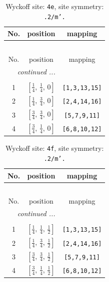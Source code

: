 \documentclass[fleqn,8pt]{jsarticle}
\begin{document}
\renewcommand{\arraystretch}{1.2}
\begin{longtable}{ccc}
\caption{Wyckoff site: {\tt 4e}, site symmetry: {\tt .2/m'.}}
 \\
 \hline \hline
No. & position & mapping \\ \hline \endfirsthead

\multicolumn{2}{l}{\tablename\ \thetable{}} \\
 \hline \hline
No. & position & mapping \\ \hline \endhead

 \hline \hline
\multicolumn{2}{r}{\footnotesize\it continued ...} \\ \endfoot

 \hline \hline
\multicolumn{2}{r}{} \\ \endlastfoot

1 & $\left[ \frac{1}{4},\, \frac{1}{4},\, 0 \right]$ & {\tt [1,3,13,15]} \\ \hline
2 & $\left[ \frac{1}{4},\, \frac{3}{4},\, 0 \right]$ & {\tt [2,4,14,16]} \\ \hline
3 & $\left[ \frac{3}{4},\, \frac{3}{4},\, 0 \right]$ & {\tt [5,7,9,11]} \\ \hline
4 & $\left[ \frac{3}{4},\, \frac{1}{4},\, 0 \right]$ & {\tt [6,8,10,12]} \\
\end{longtable}
\renewcommand{\arraystretch}{1.2}
\begin{longtable}{ccc}
\caption{Wyckoff site: {\tt 4f}, site symmetry: {\tt .2/m'.}}
 \\
 \hline \hline
No. & position & mapping \\ \hline \endfirsthead

\multicolumn{2}{l}{\tablename\ \thetable{}} \\
 \hline \hline
No. & position & mapping \\ \hline \endhead

 \hline \hline
\multicolumn{2}{r}{\footnotesize\it continued ...} \\ \endfoot

 \hline \hline
\multicolumn{2}{r}{} \\ \endlastfoot

1 & $\left[ \frac{1}{4},\, \frac{1}{4},\, \frac{1}{2} \right]$ & {\tt [1,3,13,15]} \\ \hline
2 & $\left[ \frac{1}{4},\, \frac{3}{4},\, \frac{1}{2} \right]$ & {\tt [2,4,14,16]} \\ \hline
3 & $\left[ \frac{3}{4},\, \frac{3}{4},\, \frac{1}{2} \right]$ & {\tt [5,7,9,11]} \\ \hline
4 & $\left[ \frac{3}{4},\, \frac{1}{4},\, \frac{1}{2} \right]$ & {\tt [6,8,10,12]} \\
\end{longtable}
\end{document}
